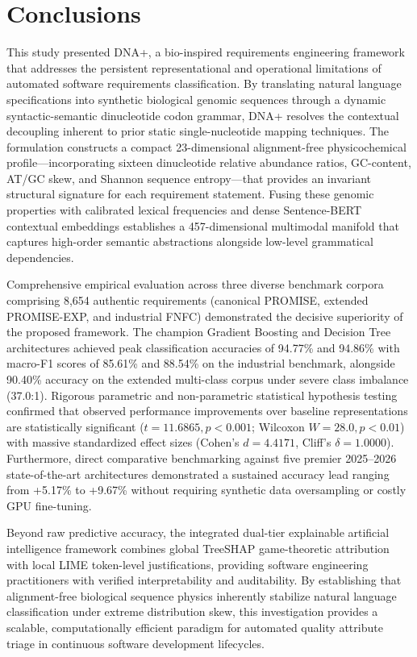 \section{Conclusions}
This study presented DNA+, a bio-inspired requirements engineering framework that addresses the persistent representational and operational limitations of automated software requirements classification. By translating natural language specifications into synthetic biological genomic sequences through a dynamic syntactic-semantic dinucleotide codon grammar, DNA+ resolves the contextual decoupling inherent to prior static single-nucleotide mapping techniques. The formulation constructs a compact 23-dimensional alignment-free physicochemical profile—incorporating sixteen dinucleotide relative abundance ratios, GC-content, AT/GC skew, and Shannon sequence entropy—that provides an invariant structural signature for each requirement statement. Fusing these genomic properties with calibrated lexical frequencies and dense Sentence-BERT contextual embeddings establishes a 457-dimensional multimodal manifold that captures high-order semantic abstractions alongside low-level grammatical dependencies.

Comprehensive empirical evaluation across three diverse benchmark corpora comprising 8,654 authentic requirements (canonical PROMISE, extended PROMISE-EXP, and industrial FNFC) demonstrated the decisive superiority of the proposed framework. The champion Gradient Boosting and Decision Tree architectures achieved peak classification accuracies of 94.77\% and 94.86\% with macro-F1 scores of 85.61\% and 88.54\% on the industrial benchmark, alongside 90.40\% accuracy on the extended multi-class corpus under severe class imbalance (37.0:1). Rigorous parametric and non-parametric statistical hypothesis testing confirmed that observed performance improvements over baseline representations are statistically significant ($t = 11.6865, p < 0.001$; Wilcoxon $W = 28.0, p < 0.01$) with massive standardized effect sizes (Cohen's $d = 4.4171$, Cliff's $\delta = 1.0000$). Furthermore, direct comparative benchmarking against five premier 2025--2026 state-of-the-art architectures demonstrated a sustained accuracy lead ranging from +5.17\% to +9.67\% without requiring synthetic data oversampling or costly GPU fine-tuning.

Beyond raw predictive accuracy, the integrated dual-tier explainable artificial intelligence framework combines global TreeSHAP game-theoretic attribution with local LIME token-level justifications, providing software engineering practitioners with verified interpretability and auditability. By establishing that alignment-free biological sequence physics inherently stabilize natural language classification under extreme distribution skew, this investigation provides a scalable, computationally efficient paradigm for automated quality attribute triage in continuous software development lifecycles.

